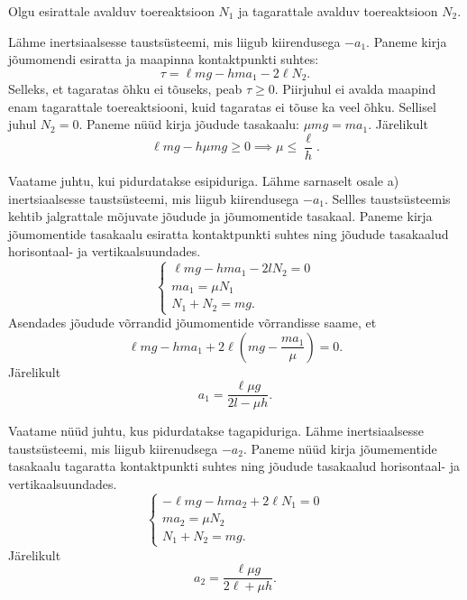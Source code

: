 \documentclass[10pt]{article}
\begin{document}
\solu
Olgu esirattale avalduv toereaktsioon $N_1$ ja tagarattale avalduv toereaktsioon $N_2$.

\osa Lähme inertsiaalsesse taustsüsteemi, mis liigub kiirendusega $-a_1$. Paneme kirja jõumomendi esiratta ja maapinna kontaktpunkti suhtes:
\begin{equation}
  \tau=\ell mg-h m a_1 - 2\ell N_2.
\end{equation}
Selleks, et tagaratas õhku ei tõuseks, peab $\tau \geq 0$. Piirjuhul ei avalda maapind enam tagarattale toereaktsiooni, kuid tagaratas ei tõuse ka veel õhku. Sellisel juhul $N_2=0$. Paneme nüüd kirja jõudude tasakaalu: $\mu mg = m a_1$. Järelikult
\begin{equation}
\ell mg-h \mu mg \geq 0 \implies \mu \leq \frac{\ell}{h}.
\end{equation}

\osa Vaatame juhtu, kui pidurdatakse esipiduriga. Lähme sarnaselt osale a) inertsiaalsesse taustsüsteemi, mis liigub kiirendusega $-a_1$.  Sellles taustsüsteemis kehtib jalgrattale mõjuvate jõudude ja jõumomentide tasakaal. Paneme kirja jõumomentide tasakaalu esiratta kontaktpunkti suhtes ning jõudude tasakaalud horisontaal- ja vertikaalsuundades.
\begin{equation}
\begin{cases}
  \ell m g - h m a_1  - 2l N_2 =0 \\
  m a_1 = \mu N_1\\
  N_1 + N_2 = mg.
\end{cases}
\end{equation}
Asendades jõudude võrrandid jõumomentide võrrandisse saame, et
\begin{equation}
\ell m g -h m a_1 + 2 \ell \left( mg - \frac{m a_1}{\mu }\right) = 0.
\end{equation}
Järelikult
\begin{equation}
a_1=\frac{\ell \mu g}{2l - \mu h}.
\end{equation}

Vaatame nüüd juhtu, kus pidurdatakse tagapiduriga. Lähme inertsiaalsesse taustsüsteemi, mis liigub kiirenudsega $-a_2$. Paneme nüüd kirja jõumementide tasakaalu tagaratta kontaktpunkti suhtes ning jõudude tasakaalud horisontaal- ja vertikaalsuundades.
\begin{equation}
\begin{cases}
  - \ell m g - h m a_2  + 2\ell N_1 =0 \\
  m a_2 = \mu N_2\\
  N_1 + N_2 = mg.
\end{cases}
\end{equation}
Järelikult
\begin{equation}
a_2=\frac{\ell \mu g}{2\ell + \mu h}.
\end{equation}
\end{document}
